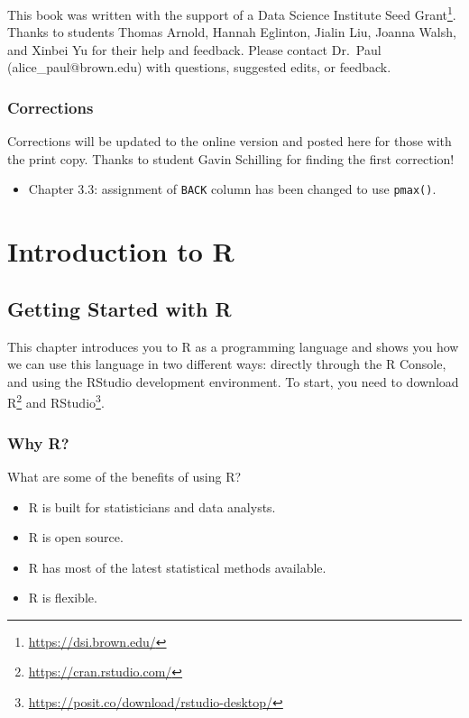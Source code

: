 \documentclass[
  letterpaper,
]{latex/krantz}
\providecommand{\tightlist}{%
  \setlength{\itemsep}{0pt}\setlength{\parskip}{0pt}}\usepackage{longtable,booktabs,array}
\renewcommand{\href}[2]{#2\footnote{\url{#1}}}
\begin{document}

This book was written with the support of a
\href{https://dsi.brown.edu/}{Data Science Institute Seed Grant}. Thanks
to students Thomas Arnold, Hannah Eglinton, Jialin Liu, Joanna Walsh,
and Xinbei Yu for their help and feedback. Please contact Dr.~Paul
(alice\_paul@brown.edu) with questions, suggested edits, or feedback.

\section*{Corrections}\label{corrections}


Corrections will be updated to the online version and posted here for
those with the print copy. Thanks to student Gavin Schilling for finding
the first correction!

\begin{itemize}
\tightlist
\item
  Chapter 3.3: assignment of \texttt{BACK} column has been changed to
  use \texttt{pmax()}.
\end{itemize}

\mainmatter

\part{Introduction to R}

\chapter{Getting Started with R}\label{sec-intro-to-r}

This chapter introduces you to R as a programming language and shows you
how we can use this language in two different ways: directly through the
R Console, and using the RStudio development environment. To start, you
need to download \href{https://cran.rstudio.com/}{R} and
\href{https://posit.co/download/rstudio-desktop/}{RStudio}.

\section{Why R?}\label{why-r}

What are some of the benefits of using R?

\begin{itemize}
\tightlist
\item
  R is built for statisticians and data analysts.\\
\item
  R is open source.\\
\item
  R has most of the latest statistical methods available.\\
\item
  R is flexible.
\end{itemize}
\end{document}
